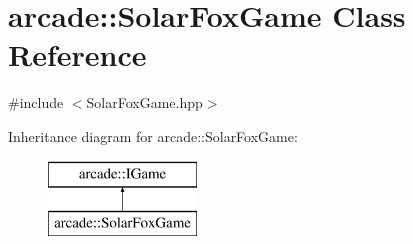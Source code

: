 \hypertarget{classarcade_1_1_solar_fox_game}{}\section{arcade\+:\+:Solar\+Fox\+Game Class Reference}
\label{classarcade_1_1_solar_fox_game}


{\ttfamily \#include $<$Solar\+Fox\+Game.\+hpp$>$}

Inheritance diagram for arcade\+:\+:Solar\+Fox\+Game\+:\begin{figure}[H]
\begin{center}
\leavevmode
\includegraphics[height=2.000000cm]{classarcade_1_1_solar_fox_game}
\end{center}
\end{figure}
